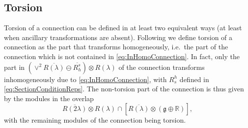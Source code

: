 \subsection{Torsion}\label{sec:TorsionSubSec}
Torsion of a connection can be defined in at least two equivalent ways (at least when ancillary transformations are absent). Following \cite{Cederwall:2013naa} we define torsion of a connection as the part that transforms homogeneously, i.e.\ the part of the connection which is not contained in \eqref{eq:InHomoConnection}. In fact, only the part in $\left(\vee^2\overbar{R(\lambda)}\ominus \overbar{R_h^s}\right)\otimes R(\lambda)$ of the connection transforms inhomogeneously due to \eqref{eq:InHomoConnection}, with $R_s^h$ defined in \eqref{eq:SectionConditionReps}. The non-torsion part of the connection is thus given by the modules in the overlap 
\begin{equation}
    \overbar{R(2\lambda)}\otimes R(\lambda) \cap \left[\overbar{R(\lambda)}\otimes \left(\mathfrak{g}\oplus \mathbb{R}\right)\right],
\end{equation}
with the remaining modules of the connection being torsion. 

